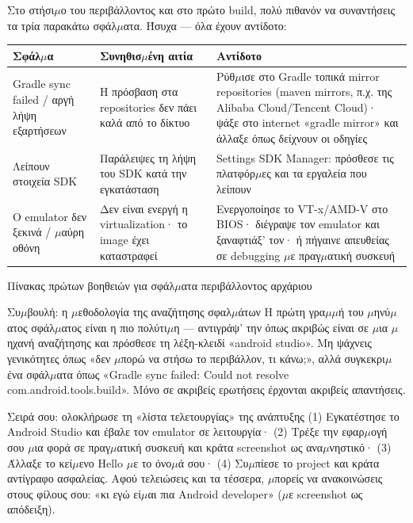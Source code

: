 
Στο στήσι$\mu$ο του περιβάλλοντος και στο πρώτο build, πολύ πιθανόν να συναντήσεις τα τρία παρακάτω σφάλ$\mu$ατα. Ήσυχα — όλα έχουν αντίδοτο:

\begin{center}
\begin{tabularx}{\linewidth}{|X|X|X|}
\hline
\textbf{Σφάλ$\mu$α} & \textbf{Συνηθισ$\mu$ένη αιτία} & \textbf{Αντίδοτο} \tabularnewline
\hline
Gradle sync failed / αργή λήψη εξαρτήσεων & Η πρόσβαση στα repositories δεν πάει καλά από το δίκτυο & Ρύθ$\mu$ισε στο Gradle τοπικά mirror repositories (maven mirrors, π.χ. της Alibaba Cloud/Tencent Cloud)· ψάξε στο internet «gradle mirror» και άλλαξε όπως δείχνουν οι οδηγίες \tabularnewline
Λείπουν στοιχεία SDK & Παράλειψες τη λήψη του SDK κατά την εγκατάσταση & Settings SDK Manager: πρόσθεσε τις πλατφόρ$\mu$ες και τα εργαλεία που λείπουν \tabularnewline
Ο emulator δεν ξεκινά / $\mu$αύρη οθόνη & Δεν είναι ενεργή η virtualization· το image έχει καταστραφεί & Ενεργοποίησε το VT-x/AMD-V στο BIOS· διέγραψε τον emulator και ξαναφτιάξ' τον· ή πήγαινε απευθείας σε debugging $\mu$ε πραγ$\mu$ατική συσκευή \tabularnewline
\hline
\end{tabularx}
\end{center}

\begin{center}\small\color{gray}Πίνακας πρώτων βοηθειών για σφάλ$\mu$ατα περιβάλλοντος αρχάριου\end{center}

\begin{tcbinfo}{Συ$\mu$βουλή: η $\mu$εθοδολογία της αναζήτησης σφαλ$\mu$άτων}
Η πρώτη γρα$\mu$$\mu$ή του $\mu$ηνύ$\mu$ατος σφάλ$\mu$ατος είναι η πιο πολύτι$\mu$η — αντιγράψ' την όπως ακριβώς είναι σε $\mu$ια $\mu$ηχανή αναζήτησης και πρόσθεσε τη λέξη-κλειδί «android studio». Μη ψάχνεις γενικότητες όπως «δεν $\mu$πορώ να στήσω το περιβάλλον, τι κάνω;», αλλά συγκεκρι$\mu$ένα σφάλ$\mu$ατα όπως «Gradle sync failed: Could not resolve com.android.tools.build». Μόνο σε ακριβείς ερωτήσεις έρχονται ακριβείς απαντήσεις.

\end{tcbinfo}

\begin{tcbpractice}{Σειρά σου: ολοκλήρωσε τη «λίστα τελετουργίας» της ανάπτυξης}
(1) Εγκατέστησε το Android Studio και έβαλε τον emulator σε λειτουργία· (2) Τρέξε την εφαρ$\mu$ογή σου $\mu$ια φορά σε πραγ$\mu$ατική συσκευή και κράτα screenshot ως ανα$\mu$νηστικό· (3) Άλλαξε το κεί$\mu$ενο Hello $\mu$ε το όνο$\mu$ά σου· (4) Συ$\mu$πίεσε το project και κράτα αντίγραφο ασφαλείας. Αφού τελειώσεις και τα τέσσερα, $\mu$πορείς να ανακοινώσεις στους φίλους σου: «κι εγώ εί$\mu$αι πια Android developer» ($\mu$ε screenshot ως απόδειξη).

\end{tcbpractice}

